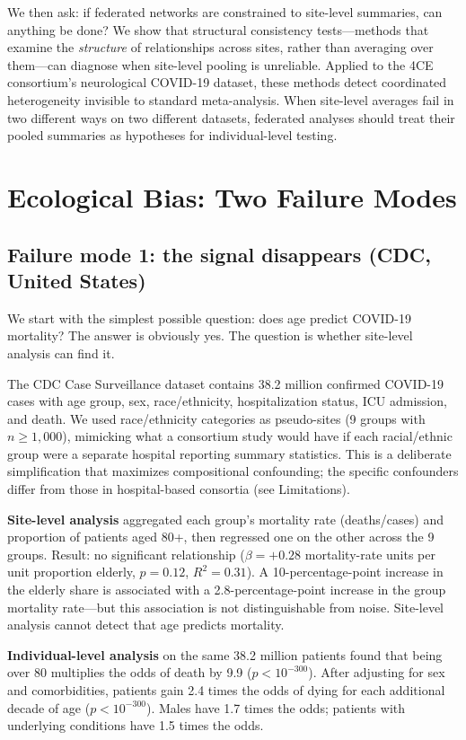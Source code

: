 \documentclass{article}
\begin{document}
We then ask: if federated networks are constrained to site-level summaries,
can anything be done?  We show that structural consistency tests---methods
that examine the \emph{structure} of relationships across sites, rather than
averaging over them---can diagnose when site-level pooling is unreliable.
Applied to the 4CE consortium's neurological COVID-19 dataset, these methods
detect coordinated heterogeneity invisible to standard meta-analysis.  When
site-level averages fail in two different ways on two different datasets,
federated analyses should treat their pooled summaries as hypotheses for
individual-level testing.


\section{Ecological Bias: Two Failure Modes}

\subsection{Failure mode 1: the signal disappears (CDC, United States)}

We start with the simplest possible question: does age predict COVID-19
mortality?  The answer is obviously yes.  The question is whether site-level
analysis can find it.

The CDC Case Surveillance dataset contains 38.2 million confirmed COVID-19
cases with age group, sex, race/ethnicity, hospitalization status, ICU
admission, and death.  We used race/ethnicity categories as pseudo-sites (9
groups with $n \geq 1{,}000$), mimicking what a consortium study would have
if each racial/ethnic group were a separate hospital reporting summary
statistics.  This is a deliberate simplification that maximizes
compositional confounding; the specific confounders differ from those in
hospital-based consortia (see Limitations).

\textbf{Site-level analysis} aggregated each group's mortality rate
(deaths/cases) and proportion of patients aged 80+, then regressed one on the
other across the 9 groups.  Result: no significant relationship ($\beta =
+0.28$ mortality-rate units per unit proportion elderly, $p = 0.12$,
$R^2 = 0.31$).  A 10-percentage-point increase in the elderly share is
associated with a 2.8-percentage-point increase in the group mortality
rate---but this association is not distinguishable from noise.  Site-level
analysis cannot detect that age predicts mortality.

\textbf{Individual-level analysis} on the same 38.2 million patients found
that being over 80 multiplies the odds of death by 9.9 ($p < 10^{-300}$).
After adjusting for sex and comorbidities, patients gain 2.4 times the odds of
dying for each additional decade of age ($p < 10^{-300}$).  Males have 1.7
times the odds; patients with underlying conditions have 1.5 times the odds.
\end{document}
